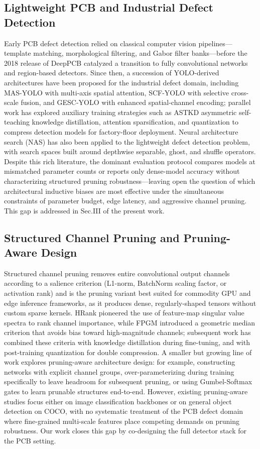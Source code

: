 \documentclass[conference]{IEEEtran}
\begin{document}
\subsection{Lightweight PCB and Industrial Defect Detection}
Early PCB defect detection relied on classical computer vision pipelines—template matching, morphological filtering, and Gabor filter banks—before the 2018 release of DeepPCB catalyzed a transition to fully convolutional networks and region-based detectors. Since then, a succession of YOLO-derived architectures have been proposed for the industrial defect domain, including MAS-YOLO with multi-axis spatial attention, SCF-YOLO with selective cross-scale fusion, and GESC-YOLO with enhanced spatial-channel encoding; parallel work has explored auxiliary training strategies such as ASTKD asymmetric self-teaching knowledge distillation, attention sparsification, and quantization to compress detection models for factory-floor deployment. Neural architecture search (NAS) has also been applied to the lightweight defect detection problem, with search spaces built around depthwise separable, ghost, and shuffle operators. Despite this rich literature, the dominant evaluation protocol compares models at mismatched parameter counts or reports only dense-model accuracy without characterizing structured pruning robustness—leaving open the question of which architectural inductive biases are most effective under the simultaneous constraints of parameter budget, edge latency, and aggressive channel pruning. This gap is addressed in Sec.III of the present work.

\subsection{Structured Channel Pruning and Pruning-Aware Design}
Structured channel pruning removes entire convolutional output channels according to a salience criterion (L1-norm, BatchNorm scaling factor, or activation rank) and is the pruning variant best suited for commodity GPU and edge inference frameworks, as it produces dense, regularly-shaped tensors without custom sparse kernels. HRank pioneered the use of feature-map singular value spectra to rank channel importance, while FPGM introduced a geometric median criterion that avoids bias toward high-magnitude channels; subsequent work has combined these criteria with knowledge distillation during fine-tuning, and with post-training quantization for double compression. A smaller but growing line of work explores pruning-aware architecture design: for example, constructing networks with explicit channel groups, over-parameterizing during training specifically to leave headroom for subsequent pruning, or using Gumbel-Softmax gates to learn prunable structures end-to-end. However, existing pruning-aware studies focus either on image classification backbones or on general object detection on COCO, with no systematic treatment of the PCB defect domain where fine-grained multi-scale features place competing demands on pruning robustness. Our work closes this gap by co-designing the full detector stack for the PCB setting.
\end{document}
